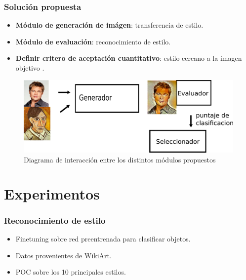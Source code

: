 \documentclass[10pt,center]{beamer}
\begin{document}
\begin{frame}
 \frametitle{Solución propuesta}
  \begin{itemize}
   \item \textbf{Módulo de generación de imágen}: transferencia de estilo.
   \item \textbf{Módulo de evaluación}: reconocimiento de estilo.
   \item \textbf{Definir critero de aceptación cuantitativo}: estilo cercano a la imagen objetivo .
  \end{itemize}
  \begin{figure}[h]
    \begin{center}
      \includegraphics[width=\linewidth]{./img/diagrama.png}
    \end{center}
    \caption{Diagrama de interacción entre los distintos módulos propuestos}
  \end{figure}
\end{frame}

\section{Experimentos}
\begin{frame}
  \frametitle{Reconocimiento de estilo}
  \begin{itemize}
    \item Finetuning sobre red preentrenada para clasificar objetos.
    \item Datos provenientes de WikiArt.
    \item POC sobre los 10 principales estilos.
  \end{itemize}
\end{frame}
\end{document}
